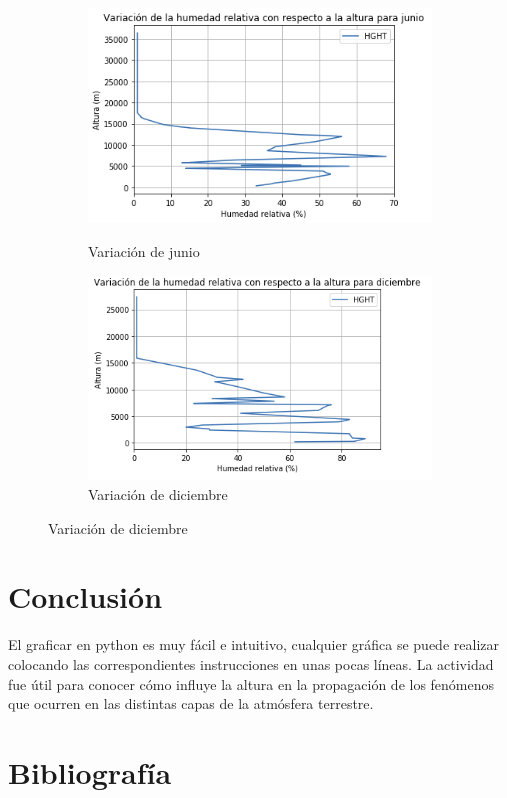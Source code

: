 \documentclass{article}
\begin{document}
\begin{figure}[h!]
\begin{subfigure}{.30\textwidth}
  \
  \includegraphics[width=.8\linewidth]{humr.png}
  \caption{Variación de junio}
  \label{fig:sfig1}
\end{subfigure}
\begin{subfigure}{.30\textwidth}
  \left
  \includegraphics[width=.8\linewidth]{humr2.png}
  \caption{Variación de diciembre}
  \label{fig:sfig2}
\end{subfigure}
\end{figure}

\section{Conclusión}

El graficar en python es muy fácil e intuitivo, cualquier gráfica se puede realizar colocando las correspondientes instrucciones en unas pocas líneas. La actividad fue útil para conocer cómo influye la altura en la propagación de los fenómenos que ocurren en las distintas capas de la atmósfera terrestre. 

\section{Bibliografía}
\end{document}

